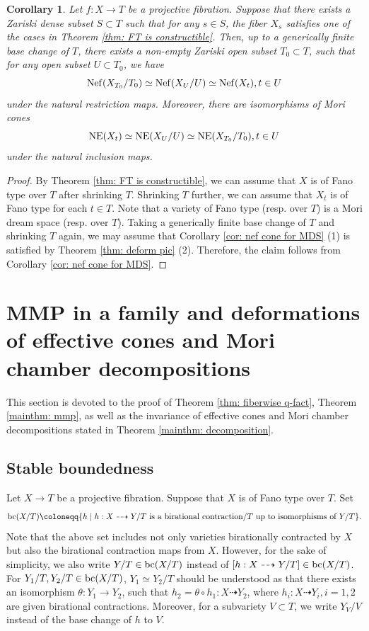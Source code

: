 \documentclass[11pt,oneside,reqno]{amsart}
\numberwithin{equation}{section}
\newtheorem{corollary}[proposition]{Corollary}
\theoremstyle{definition}
\newcommand{\Nef}{{\rm {Nef}}}
\newcommand{\bc}{{\rm {bc}}}
\newcommand{\NE}{{\rm {NE}}}
\begin{document}
\begin{corollary}\label{cor: nef cone for FT}
Let $f: X \to T$ be a projective fibration. Suppose that there exists a Zariski dense subset $S\subset T$ such that for any $s\in S$, the fiber $X_s$ satisfies one of the cases in Theorem \ref{thm: FT is constructible}. Then, up to a generically finite base change of $T$, there exists a non-empty Zariski open subset $T_0\subset T$, such that for any open subset $U\subset T_0$, we have
\[
\Nef(X_{T_0}/T_0) \simeq \Nef(X_U/U) \simeq \Nef(X_t), t\in U
\] under the natural restriction maps. Moreover, there are isomorphisms of Mori cones
\[
\NE(X_t) \simeq \NE(X_U/U) \simeq \NE(X_{T_0}/T_0), t\in U
\] under the natural inclusion maps.


\end{corollary}
\begin{proof}
By Theorem \ref{thm: FT is constructible}, we can assume that $X$ is of Fano type over $T$ after shrinking $T$. Shrinking $T$ further, we can assume that $X_t$ is of Fano type for each $t\in T$. Note that a variety of Fano type (resp. over $T$) is a Mori dream space (resp. over $T$). Taking a generically finite base change of $T$ and shrinking $T$ again, we may assume that Corollary \ref{cor: nef cone for MDS} (1) is satisfied by Theorem \ref{thm: deform pic} (2). Therefore, the claim follows from Corollary \ref{cor: nef cone for MDS}.
\end{proof}



\section{MMP in a family and deformations of effective cones and Mori chamber decompositions}\label{sec: mmp}

This section is devoted to the proof of Theorem \ref{thm: fiberwise q-fact}, Theorem \ref{mainthm: mmp}, as well as the invariance of effective cones and Mori chamber decompositions stated in Theorem \ref{mainthm: decomposition}.

\subsection{Stable boundedness}\label{subsec: stable boundedness}
Let $X \to T$ be a projective fibration. Suppose that $X$ is of Fano type over $T$. Set 
\[
\bc(X/T) \coloneqq \{h \mid h: X \dasharrow Y/T \text{~is a birational contraction}/T \text{~up to isomorphisms of~} Y/T\}.
\] Note that the above set includes not only varieties birationally contracted by $X$ but also the birational contraction maps from $X$. However, for the sake of simplicity, we also write $Y/T \in \bc(X/T)$ instead of $[h: X \dasharrow Y/T]\in \bc(X/T)$. For $Y_1/T, Y_2/T \in \bc(X/T)$, $Y_1 \simeq Y_2/T$ should be understood as that there exists an isomorphism $\theta: Y_1 \to Y_2$, such that $h_2 =\theta \circ h_1: X \dasharrow Y_2$, where $h_i: X \dasharrow Y_i, i=1,2$ are given birational contractions. Moreover, for a subvariety $V\subset T$, we write $Y_V/V$ instead of the base change of $h$ to $V$. 
\end{document}
